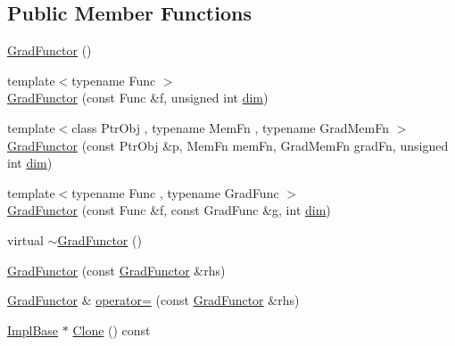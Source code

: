 \subsection*{Public Member Functions}
\begin{DoxyCompactItemize}
\item 
\mbox{\hyperlink{classROOT_1_1Math_1_1GradFunctor_a68c75192981688e292ee84be652a8ec4}{Grad\+Functor}} ()
\item 
{\footnotesize template$<$typename Func $>$ }\\\mbox{\hyperlink{classROOT_1_1Math_1_1GradFunctor_a9cdbcd3d49494b4209524b3c5b3172d2}{Grad\+Functor}} (const Func \&f, unsigned int \mbox{\hyperlink{adat__devel_2lib_2hadron_2irrep__util_8cc_a70b5e28b5bc3d1b63a7435c5fe50b837}{dim}})
\item 
{\footnotesize template$<$class Ptr\+Obj , typename Mem\+Fn , typename Grad\+Mem\+Fn $>$ }\\\mbox{\hyperlink{classROOT_1_1Math_1_1GradFunctor_af7c06950b37bea8844b81f53b0bf41df}{Grad\+Functor}} (const Ptr\+Obj \&p, Mem\+Fn mem\+Fn, Grad\+Mem\+Fn grad\+Fn, unsigned int \mbox{\hyperlink{adat__devel_2lib_2hadron_2irrep__util_8cc_a70b5e28b5bc3d1b63a7435c5fe50b837}{dim}})
\item 
{\footnotesize template$<$typename Func , typename Grad\+Func $>$ }\\\mbox{\hyperlink{classROOT_1_1Math_1_1GradFunctor_a079a63821986eb0ce6e011c366c1cb9a}{Grad\+Functor}} (const Func \&f, const Grad\+Func \&g, int \mbox{\hyperlink{adat__devel_2lib_2hadron_2irrep__util_8cc_a70b5e28b5bc3d1b63a7435c5fe50b837}{dim}})
\item 
virtual \mbox{\hyperlink{classROOT_1_1Math_1_1GradFunctor_a1dfc4e8382f679a935eae97c5e7ee4dd}{$\sim$\+Grad\+Functor}} ()
\item 
\mbox{\hyperlink{classROOT_1_1Math_1_1GradFunctor_a629b55d9f326dbf39e5c3ccfb4678579}{Grad\+Functor}} (const \mbox{\hyperlink{classROOT_1_1Math_1_1GradFunctor}{Grad\+Functor}} \&rhs)
\item 
\mbox{\hyperlink{classROOT_1_1Math_1_1GradFunctor}{Grad\+Functor}} \& \mbox{\hyperlink{classROOT_1_1Math_1_1GradFunctor_a7f7a0c6b466d283cb6085f0e57ab1e6a}{operator=}} (const \mbox{\hyperlink{classROOT_1_1Math_1_1GradFunctor}{Grad\+Functor}} \&rhs)
\item 
\mbox{\hyperlink{classROOT_1_1Math_1_1GradFunctor_a1fb9161fc93c7e7fa185dddbcc2c4f4d}{Impl\+Base}} $\ast$ \mbox{\hyperlink{classROOT_1_1Math_1_1GradFunctor_a21093c0d3001069e49ce6278b5a32a40}{Clone}} () const
\item 

\end{DoxyCompactItemize}
